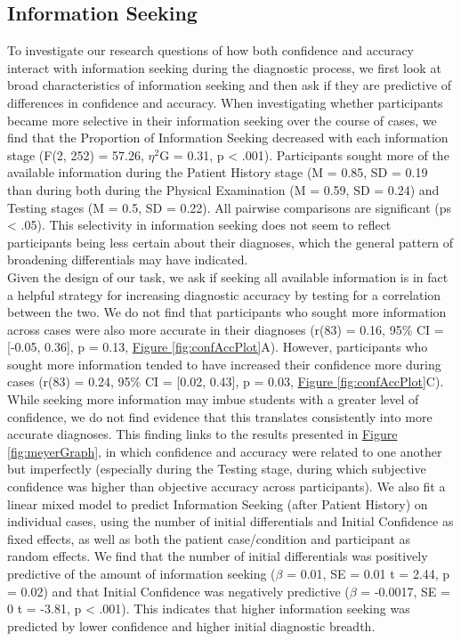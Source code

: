 \documentclass[a4paper, nobind]{templates/ociamthesis}
\begin{document}
\newpage

\subsection{Information Seeking}\label{information-seeking}

To investigate our research questions of how both confidence and accuracy interact with information seeking during the diagnostic process, we first look at broad characteristics of information seeking and then ask if they are predictive of differences in confidence and accuracy. When investigating whether participants became more selective in their information seeking over the course of cases, we find that the Proportion of Information Seeking decreased with each information stage (F(2, 252) = 57.26, \(\eta^2\)G = 0.31, p \textless{} .001). Participants sought more of the available information during the Patient History stage (M = 0.85, SD = 0.19 than during both during the Physical Examination (M = 0.59, SD = 0.24) and Testing stages (M = 0.5, SD = 0.22). All pairwise comparisons are significant (ps \textless{} .05). This selectivity in information seeking does not seem to reflect participants being less certain about their diagnoses, which the general pattern of broadening differentials may have indicated.\\

Given the design of our task, we ask if seeking all available information is in fact a helpful strategy for increasing diagnostic accuracy by testing for a correlation between the two. We do not find that participants who sought more information across cases were also more accurate in their diagnoses (r(83) = 0.16, 95\% CI = {[}-0.05, 0.36{]}, p = 0.13, \hyperref[fig:confAccPlot]{Figure \ref{fig:confAccPlot}}A). However, participants who sought more information tended to have increased their confidence more during cases (r(83) = 0.24, 95\% CI = {[}0.02, 0.43{]}, p = 0.03, \hyperref[fig:confAccPlot]{Figure \ref{fig:confAccPlot}}C). While seeking more information may imbue students with a greater level of confidence, we do not find evidence that this translates consistently into more accurate diagnoses. This finding links to the results presented in \hyperref[fig:meyerGraph]{Figure \ref{fig:meyerGraph}}, in which confidence and accuracy were related to one another but imperfectly (especially during the Testing stage, during which subjective confidence was higher than objective accuracy across participants). We also fit a linear mixed model to predict Information Seeking (after Patient History) on individual cases, using the number of initial differentials and Initial Confidence as fixed effects, as well as both the patient case/condition and participant as random effects. We find that the number of initial differentials was positively predictive of the amount of information seeking (\(\beta\) = 0.01, SE = 0.01 t = 2.44, p = 0.02) and that Initial Confidence was negatively predictive (\(\beta\) = -0.0017, SE = 0 t = -3.81, p \textless{} .001). This indicates that higher information seeking was predicted by lower confidence and higher initial diagnostic breadth.
\end{document}
